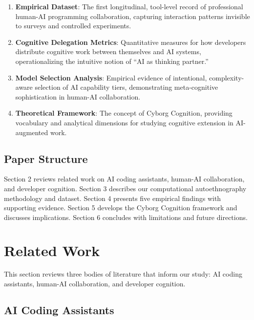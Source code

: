 \documentclass{ntlabs-preprint}
\begin{document}
\begin{enumerate}
    \item \textbf{Empirical Dataset}: The first longitudinal, tool-level record of professional human-AI programming collaboration, capturing interaction patterns invisible to surveys and controlled experiments.

    \item \textbf{Cognitive Delegation Metrics}: Quantitative measures for how developers distribute cognitive work between themselves and AI systems, operationalizing the intuitive notion of ``AI as thinking partner.''

    \item \textbf{Model Selection Analysis}: Empirical evidence of intentional, complexity-aware selection of AI capability tiers, demonstrating meta-cognitive sophistication in human-AI collaboration.

    \item \textbf{Theoretical Framework}: The concept of Cyborg Cognition, providing vocabulary and analytical dimensions for studying cognitive extension in AI-augmented work.
\end{enumerate}

\subsection{Paper Structure}

Section 2 reviews related work on AI coding assistants, human-AI collaboration, and developer cognition. Section 3 describes our computational autoethnography methodology and dataset. Section 4 presents five empirical findings with supporting evidence. Section 5 develops the Cyborg Cognition framework and discusses implications. Section 6 concludes with limitations and future directions.

\section{Related Work}

This section reviews three bodies of literature that inform our study: AI coding assistants, human-AI collaboration, and developer cognition.

\subsection{AI Coding Assistants}
\end{document}
